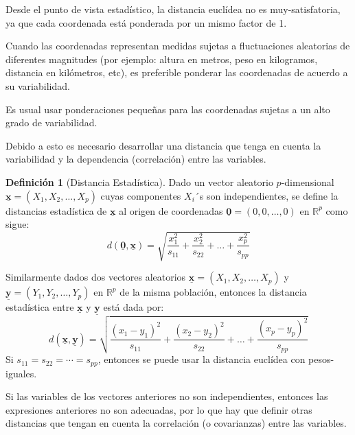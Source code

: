 \documentclass[
]{book}
\theoremstyle{definition}
\newtheorem{definition}{Definición}[chapter]
\theoremstyle{definition}
\theoremstyle{definition}
\theoremstyle{definition}
\theoremstyle{remark}
\begin{document}
Desde el punto de vista estadístico, la distancia euclídea no es muy-satisfatoria, ya que cada coordenada está ponderada por un mismo factor de 1.

Cuando las coordenadas representan medidas sujetas a fluctuaciones aleatorias de diferentes magnitudes (por ejemplo: altura en metros, peso en kilogramos, distancia en kilómetros, etc), es preferible ponderar las coordenadas de acuerdo a su variabilidad.

Es usual usar ponderaciones pequeñas para las coordenadas sujetas a un alto grado de variabilidad.

Debido a esto es necesario desarrollar una distancia que tenga en cuenta la variabilidad y la dependencia (correlación) entre las variables.

\begin{definition}[Distancia Estadística]
\protect\hypertarget{def:dist-estad}{}\label{def:dist-estad}Dado un vector aleatorio \(p\)-dimensional \(\underline{\mathbf{x}}=(X_1,X_2,\ldots,X_p)\) cuyas componentes \(X_i\)´s son independientes, se define la distancias estadística de \(\underline{\mathbf{x}}\) al origen de coordenadas \(\underline{\mathbf{0}}=(0,0,\ldots,0)\) en \(\mathbb{R}^p\) como sigue:
\[
d(\underline{\mathbf{0}},\underline{\mathbf{x}})=\sqrt{\frac{x_1^2}{s_{11}}+\frac{x_2^2}{s_{22}}+\ldots+\frac{x_p^2}{s_{pp}}}
\]
\end{definition}

Similarmente dados dos vectores aleatorios \(\underline{\mathbf{x}}=(X_1,X_2,\ldots,X_p)\) y \(\underline{\mathbf{y}}=(Y_1,Y_2,\ldots,Y_p)\) en \(\mathbb{R}^p\) de la misma población, entonces la distancia estadística entre \(\underline{\mathbf{x}}\) y \(\underline{\mathbf{y}}\) está dada por:
\[
d(\underline{\mathbf{x}},\underline{\mathbf{y}})=\sqrt{\frac{(x_1-y_1)^2}{s_{11}}+\frac{(x_2-y_2)^2}{s_{22}}+\ldots+\frac{(x_p-y_p)^2}{s_{pp}}}
\]
Si \(s_{11}=s_{22}=\cdots=s_{pp}\), entonces se puede usar la distancia euclídea con pesos-iguales.

Si las variables de los vectores anteriores no son independientes, entonces las expresiones anteriores no son adecuadas, por lo que hay que definir otras distancias que tengan en cuenta la correlación (o covarianzas) entre las variables.
\end{document}
